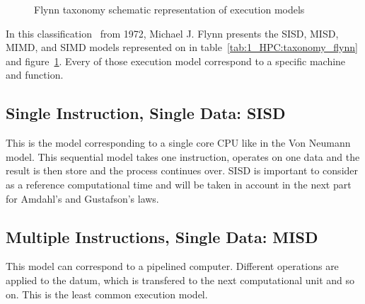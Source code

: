 \begin{table}
\centering
{}
\caption{Flynn taxonomy for execution models completed with SPMD and SIMT models}
\label{tab:1_HPC:taxonomy_flynn}
\end{table}

\begin{figure}

\caption{Flynn taxonomy schematic representation of execution models}
\label{fig:1_HPC:flynn_taxonomy}
\end{figure}

In this classification~\cite{flynn1972some} from 1972, Michael J. Flynn presents the SISD, MISD, MIMD, and SIMD models represented on in table~\ref{tab:1_HPC:taxonomy_flynn} and figure~\ref{fig:1_HPC:flynn_taxonomy}.
Every of those execution model correspond to a specific machine and function.

\subsection{Single Instruction, Single Data: SISD}
This is the model corresponding to a single core CPU like in the Von Neumann model. 
This sequential model takes one instruction, operates on one data and the result is then store and the process continues over. 
SISD is important to consider as a reference computational time and will be taken in account in the next part for Amdahl's and Gustafson's laws.

\subsection{Multiple Instructions, Single Data: MISD}
This model can correspond to a pipelined computer.
Different operations are applied to the datum, which is transfered to the next computational unit and so on. 
This is the least common execution model.



